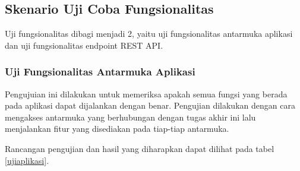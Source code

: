     \subsection{Skenario Uji Coba Fungsionalitas}
    	Uji fungsionalitas dibagi menjadi 2, yaitu uji fungsionalitas antarmuka aplikasi dan uji fungsionalitas endpoint REST API.
        
        \subsubsection{Uji Fungsionalitas Antarmuka Aplikasi} \label{ujifungsionalitasantarmuka}
        	Pengujuian ini dilakukan untuk memeriksa apakah semua fungsi yang berada pada aplikasi dapat dijalankan dengan benar. Pengujian dilakukan dengan cara mengakses antarmuka yang berhubungan dengan tugas akhir ini lalu menjalankan fitur yang disediakan pada tiap-tiap antarmuka.
        	
        	Rancangan pengujian dan hasil yang diharapkan dapat dilihat pada tabel \ref{ujiaplikasi}.
        	
